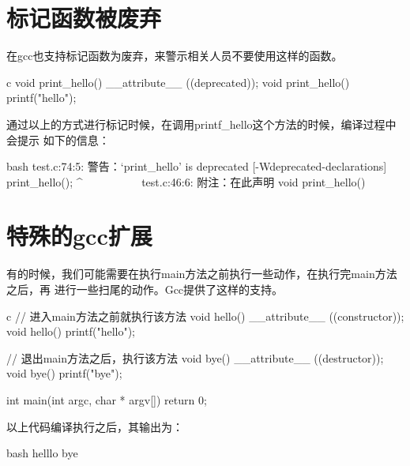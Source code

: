 \section{标记函数被废弃}
在gcc也支持标记函数为废弃，来警示相关人员不要使用这样的函数。
\begin{code-block}{c}
void print_hello() __attribute__ ((deprecated));
void print_hello()
{
    printf("hello\n");
}
\end{code-block}

通过以上的方式进行标记时候，在调用printf\_hello这个方法的时候，编译过程中会提示
如下的信息：
\begin{code-block}{bash}
test.c:74:5: 警告：‘print_hello’ is deprecated [-Wdeprecated-declarations]
     print_hello();
     ^~~~~~~~~~~
test.c:46:6: 附注：在此声明
 void print_hello()
\end{code-block}

\section{特殊的gcc扩展}
有的时候，我们可能需要在执行main方法之前执行一些动作，在执行完main方法之后，再
进行一些扫尾的动作。Gcc提供了这样的支持。
\begin{code-block}{c}
// 进入main方法之前就执行该方法
void hello() __attribute__ ((constructor));
void hello()
{
    printf("hello\n");
}

// 退出main方法之后，执行该方法
void bye() __attribute__ ((destructor));
void bye()
{
    printf("bye\n");
}

int main(int argc, char * argv[])
{
    return 0;
}
\end{code-block}

以上代码编译执行之后，其输出为：
\begin{code-block}{bash}
helllo
bye
\end{code-block}

